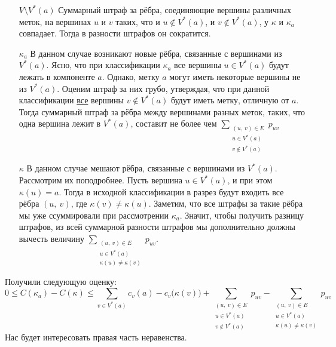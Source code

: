 \documentclass[a4paper,12pt]{article}
\begin{document}
\begin{itemize}
    \item[$V\setminus V^*(a)$] Суммарный штраф за рёбра, соединяющие вершины различных меток, на вершинах $u$ и $v$ таких, что и $u \notin V^*(a)$, и $v \notin V^*(a)$, у $\kappa$ и $\kappa_a$ совпадает. Тогда в разности штрафов он сократится.
    \item[$\kappa_a$] В данном случае возникают новые рёбра, связанные с вершинами из $V^*(a)$. Ясно, что при классификации $\kappa_a$ все вершины $u \in V^*(a)$ будут лежать в компоненте $a$. Однако, метку $a$ могут иметь некоторые вершины не из $V^*(a)$. Оценим штраф за них грубо, утверждая, что при данной классификации \underline{все} вершины $v \notin V^*(a)$ будут иметь метку, отличную от $a$. Тогда суммарный штраф за рёбра между вершинами разных меток, таких, что одна вершина лежит в $V^*(a)$, составит не более чем $\displaystyle\sum\limits_{\substack{(u,\ v)\in E\\u \in V^*(a)\\ v \notin V^*(a)}}p_{uv}$
    \item[$\kappa$] В данном случае мешают рёбра, связанные с вершинами из $V^*(a)$. Рассмотрим их поподробнее. Пусть вершина $u \in V^*(a)$, и при этом $\kappa(u) = a$. Тогда в исходной классификации в разрез будут входить все рёбра $(u,\ v)$, где $\kappa(v) \neq \kappa(u)$. Заметим, что все штрафы за такие рёбра мы уже ссуммировали при рассмотрении $\kappa_a$. Значит, чтобы получить разницу штрафов, из всей суммарной разности штрафов мы дополнительно должны вычесть величину $\displaystyle\sum\limits_{\substack{(u,\ v)\in E\\u \in V^*(a)\\ \kappa(u)\neq \kappa(v)}}p_{uv}$.
\end{itemize}

Получили следующую оценку:
\[0 \leqslant C(\kappa_a) - C(\kappa)\leqslant \sum\limits_{v \in V^*(a)}c_v(a) - c_v\big(\kappa(v)\big) + \displaystyle\sum\limits_{\substack{(u,\ v)\in E\\u \in V^*(a)\\ v \notin V^*(a)}}p_{uv} -\displaystyle\sum\limits_{\substack{(u,\ v)\in E\\u \in V^*(a)\\ \kappa(u)\neq \kappa(v)}}p_{uv} \]
Нас будет интересовать правая часть неравенства.
\end{document}
